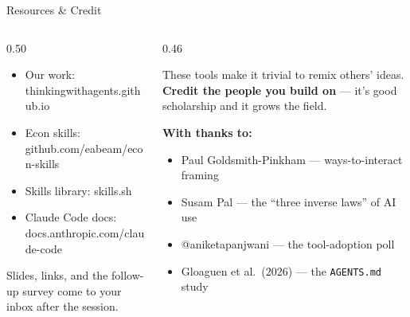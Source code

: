 \documentclass[aspectratio=169, 10pt]{beamer}
\begin{document}
\begin{frame}[fragile]{Resources \& Credit}
\vskip2pt
\begin{columns}[T]
\begin{column}{0.50\textwidth}
\begin{tcolorbox}[keybox, title={\faLink\quad Go deeper}, top=3pt, bottom=3pt]
\small
\begin{itemize}\setlength{\itemsep}{2pt}
  \item Our work: {\scriptsize\ttfamily thinkingwithagents.github.io}
  \item Econ skills: {\scriptsize\ttfamily github.com/eabeam/econ-skills}
  \item Skills library: {\scriptsize\ttfamily skills.sh}
  \item Claude Code docs: {\scriptsize\ttfamily docs.anthropic.com/claude-code}
\end{itemize}
\end{tcolorbox}
\vskip3pt
\begin{tcolorbox}[accentbox, top=2pt, bottom=2pt]
\scriptsize Slides, links, and the follow-up survey come to your inbox after the session.
\end{tcolorbox}
\end{column}
\begin{column}{0.46\textwidth}
\begin{tcolorbox}[quotebox, title={\faHandsHelping\quad Cite generously}, fonttitle=\bfseries\small, top=3pt, bottom=3pt]
\small These tools make it trivial to remix others' ideas. \textbf{Credit the people you build on} --- it's good scholarship and it grows the field.
\end{tcolorbox}
\vskip3pt
\begin{tcolorbox}[colback=PaleSage, colframe=SlateTeal!40, boxrule=0.5pt, left=5pt, right=5pt, top=3pt, bottom=3pt]
\scriptsize
\textbf{With thanks to:}
\begin{itemize}\setlength{\itemsep}{1pt}
  \item Paul Goldsmith-Pinkham --- ways-to-interact framing
  \item Susam Pal --- the ``three inverse laws'' of AI use
  \item @aniketapanjwani --- the tool-adoption poll
  \item Gloaguen et al.\ (2026) --- the \texttt{AGENTS.md} study
\end{itemize}
\end{tcolorbox}
\end{column}
\end{columns}
\end{frame}
\end{document}
